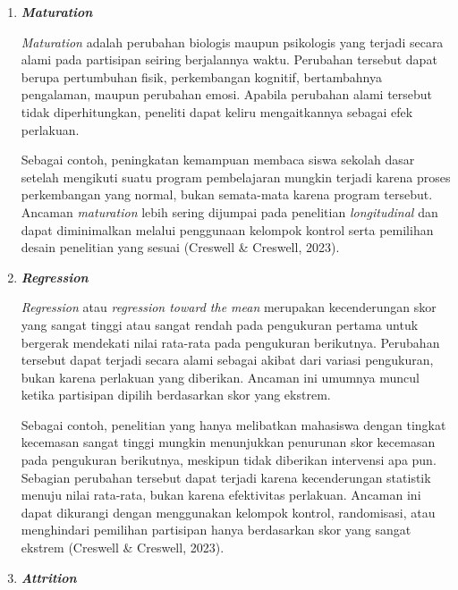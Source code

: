\documentclass[
  indonesian,
  letterpaper,
  DIV=11,
  numbers=noendperiod]{scrreprt}
\begin{document}
\begin{enumerate}
  Sebagai contoh, selama penelitian mengenai efektivitas program
  manajemen stres, kampus menerapkan kebijakan akademik baru yang
  meningkatkan tekanan belajar mahasiswa. Perubahan tingkat stres pada
  akhir penelitian mungkin dipengaruhi oleh kebijakan tersebut, bukan
  semata-mata oleh program yang dievaluasi. Penggunaan kelompok kontrol
  dan menjaga kondisi penelitian tetap konsisten merupakan cara yang
  umum digunakan untuk mengurangi ancaman \emph{history} (Creswell \&
  Creswell, 2023).
\item
  \textbf{\emph{Maturation}}

  \emph{Maturation} adalah perubahan biologis maupun psikologis yang
  terjadi secara alami pada partisipan seiring berjalannya waktu.
  Perubahan tersebut dapat berupa pertumbuhan fisik, perkembangan
  kognitif, bertambahnya pengalaman, maupun perubahan emosi. Apabila
  perubahan alami tersebut tidak diperhitungkan, peneliti dapat keliru
  mengaitkannya sebagai efek perlakuan.

  Sebagai contoh, peningkatan kemampuan membaca siswa sekolah dasar
  setelah mengikuti suatu program pembelajaran mungkin terjadi karena
  proses perkembangan yang normal, bukan semata-mata karena program
  tersebut. Ancaman \emph{maturation} lebih sering dijumpai pada
  penelitian \emph{longitudinal} dan dapat diminimalkan melalui
  penggunaan kelompok kontrol serta pemilihan desain penelitian yang
  sesuai (Creswell \& Creswell, 2023).
\item
  \textbf{\emph{Regression}}

  \emph{Regression} atau \emph{regression toward the mean} merupakan
  kecenderungan skor yang sangat tinggi atau sangat rendah pada
  pengukuran pertama untuk bergerak mendekati nilai rata-rata pada
  pengukuran berikutnya. Perubahan tersebut dapat terjadi secara alami
  sebagai akibat dari variasi pengukuran, bukan karena perlakuan yang
  diberikan. Ancaman ini umumnya muncul ketika partisipan dipilih
  berdasarkan skor yang ekstrem.

  Sebagai contoh, penelitian yang hanya melibatkan mahasiswa dengan
  tingkat kecemasan sangat tinggi mungkin menunjukkan penurunan skor
  kecemasan pada pengukuran berikutnya, meskipun tidak diberikan
  intervensi apa pun. Sebagian perubahan tersebut dapat terjadi karena
  kecenderungan statistik menuju nilai rata-rata, bukan karena
  efektivitas perlakuan. Ancaman ini dapat dikurangi dengan menggunakan
  kelompok kontrol, randomisasi, atau menghindari pemilihan partisipan
  hanya berdasarkan skor yang sangat ekstrem (Creswell \& Creswell,
  2023).
\item
  \textbf{\emph{Attrition}}


\end{enumerate}
\end{document}
